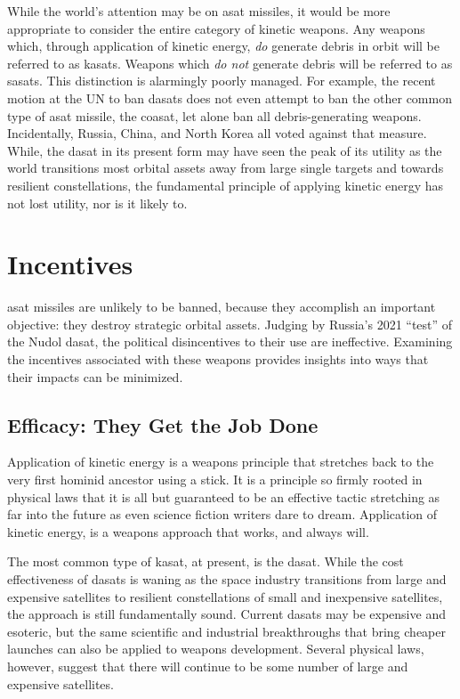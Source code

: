 While the world's attention may be on \ac{asat} missiles, it would be
more appropriate to consider the entire category of kinetic weapons.
Any weapons which, through application of kinetic energy, \emph{do}
generate debris in orbit will be referred to as \acp{kasat}.  Weapons
which \emph{do not} generate debris will be referred to as
\acp{sasat}.  This distinction is alarmingly poorly managed.  For
example, the recent motion at the UN to ban \acp{dasat} does not even
attempt to ban the other common type of \ac{asat} missile, the
\ac{coasat}, let alone ban all debris-generating weapons.
Incidentally, Russia, China, and North Korea all voted against that
measure.  While, the \ac{dasat} in its present form may have seen the
peak of its utility as the world transitions most orbital assets away
from large single targets and towards resilient constellations, the
fundamental principle of applying kinetic energy has not lost utility,
nor is it likely to.

\section*{Incentives}

\ac{asat} missiles are unlikely to be banned, because they accomplish
an important objective: they destroy strategic orbital assets.
Judging by Russia's 2021 ``test'' of the Nudol \ac{dasat}, the
political disincentives to their use are ineffective.  Examining the
incentives associated with these weapons provides insights into ways
that their impacts can be minimized.

\subsection*{Efficacy: They Get the Job Done}

Application of kinetic energy is a weapons principle that stretches
back to the very first hominid ancestor using a stick.  It is a
principle so firmly rooted in physical laws that it is all but
guaranteed to be an effective tactic stretching as far into the future
as even science fiction writers dare to dream.  Application of kinetic
energy, is a weapons approach that works, and always will.

The most common type of \ac{kasat}, at present, is the \ac{dasat}.
While the cost effectiveness of \acp{dasat} is waning as the space
industry transitions from large and expensive satellites to resilient
constellations of small and inexpensive satellites, the approach is
still fundamentally sound.  Current \acp{dasat} may be expensive and
esoteric, but the same scientific and industrial breakthroughs that
bring cheaper launches can also be applied to weapons development.
Several physical laws, however, suggest that there will continue to be
some number of large and expensive satellites.


